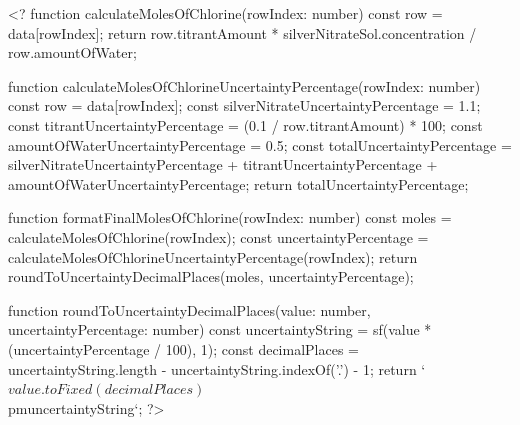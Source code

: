 \documentclass[11pt]{article}
\begin{document}
<?
function calculateMolesOfChlorine(rowIndex: number) {
	const row = data[rowIndex];
	return row.titrantAmount * silverNitrateSol.concentration / row.amountOfWater;
}

function calculateMolesOfChlorineUncertaintyPercentage(rowIndex: number) {
	const row = data[rowIndex];
	const silverNitrateUncertaintyPercentage = 1.1;
	const titrantUncertaintyPercentage = (0.1 / row.titrantAmount) * 100;
	const amountOfWaterUncertaintyPercentage = 0.5;
	const totalUncertaintyPercentage =
		silverNitrateUncertaintyPercentage +
		titrantUncertaintyPercentage +
		amountOfWaterUncertaintyPercentage;
	return totalUncertaintyPercentage;
}

function formatFinalMolesOfChlorine(rowIndex: number) {
	const moles = calculateMolesOfChlorine(rowIndex);
	const uncertaintyPercentage = calculateMolesOfChlorineUncertaintyPercentage(rowIndex);
	return roundToUncertaintyDecimalPlaces(moles, uncertaintyPercentage);
}

function roundToUncertaintyDecimalPlaces(value: number, uncertaintyPercentage: number) {
	const uncertaintyString = sf(value * (uncertaintyPercentage / 100), 1);
	const decimalPlaces = uncertaintyString.length - uncertaintyString.indexOf('.') - 1;
	return `${value.toFixed(decimalPlaces)} $\\pm$ ${uncertaintyString}`;
}
?>
\end{document}
